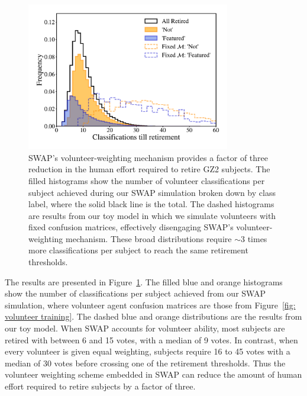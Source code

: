 \begin{figure}
\centering
\includegraphics[width=3.5in]{Figures/human_machine/f4.pdf}
\caption[SWAP's volunteer-weighting mechanism provides a factor of three reduction in the required human effort for classification tasks.]{SWAP's volunteer-weighting mechanism provides a factor of three reduction in the human effort required to retire GZ2 subjects. The filled histograms show the number of volunteer classifications per subject achieved during our SWAP simulation broken down by class label, where the solid black line is the total. The dashed histograms are results from our toy model in which we simulate volunteers with fixed confusion matrices, effectively disengaging SWAP's volunteer-weighting mechanism. These broad distributions require $\sim$3 times more classifications per subject to reach the same retirement thresholds.} 
\label{fig: swap vote distributions}
\end{figure}

The results are presented in Figure~\ref{fig: swap vote distributions}. The filled blue and orange histograms show the number of classifications per subject achieved from our SWAP simulation, where volunteer agent confusion matrices are those from Figure~\ref{fig: volunteer training}. The dashed blue and orange distributions are the results from our toy model. When SWAP accounts for volunteer ability, most subjects are retired with between 6 and 15 votes, with a median of 9 votes. In contrast, when every volunteer is given equal weighting, subjects require 16 to 45 votes with a median of 30 votes before crossing one of the retirement thresholds. Thus the volunteer weighting scheme embedded in SWAP can reduce the amount of human effort required to retire subjects by a factor of three.

